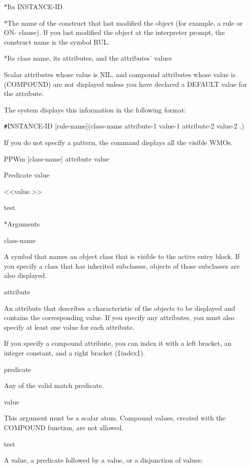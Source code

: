{{*Its INSTANCE-ID

*The name of the construct that last modified the object
(for example, a rule or ON- clause). If you last
modified the object at the interpreter prompt, the
construct name is the symbol RUL.

*Its class name, its attributes, and the attributes'
values

Scalar attributes whose value is NIL, and compound attributes
whose value is (COMPOUND) are not displayed unless you have
declared a DEFAULT value for the attribute.

The system displays this information in the following format:

\verb|#|INSTANCE-ID [rule-name](class-name attribute-1 value-1
attribute-2 value-2 .)

If you do not specify a pattern, the command displays all the
visible WMOs.



\Format

PPWm [class-name] \ct attribute  value

Predicate value

<<value.>>

{test.}



*Arguments

class-name

A symbol that names an object class that is visible to the
active entry block. If you specify a class that has inherited
subclasses, objects of those subclasses are also displayed.

attribute

An attribute that describes a characteristic of the objects
to be displayed and contains the corresponding value. If you
specify any attributes, you must also specify at least one
value for each attribute.

If you specify a compound attribute, you can index it with a
left bracket, an integer constant, and a right bracket
(\verb|[|index\verb|]|).

predicate

Any of the valid match predicate.

value

This argument must be a scalar atom. Compound values, created
with the COMPOUND function, are not allowed.



test

A value, a predicate followed by a value, or a disjunction of
values:

}}
